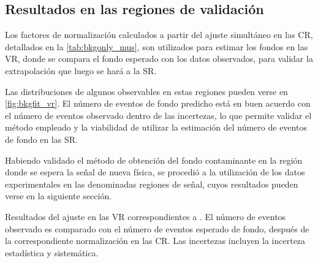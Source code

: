 \subsection{Resultados en las regiones de validación}

Los factores de normalización calculados a partir del ajuste simultáneo en las
CR, detallados en la \cref{tab:bkgonly_mus}, son utilizados para estimar los fondos
en las VR, donde se compara el fondo esperado con los datos observados, para
validar la extrapolación que luego se hará a la SR.

Las distribuciones de algunos observables en estas regiones pueden verse en
\cref{fig:bkgfit_vr}. El número de eventos de fondo predicho
está en buen acuerdo con el número de eventos observado dentro de las
incertezas, lo que permite validar el método empleado y la viabilidad de
utilizar la estimación del número de eventos de fondo en las SR.

Habiendo validado el método de obtención del fondo contaminante en la región
donde se espera la señal de nueva física, se procedió a la utilización de los
datos experimentales en las denominadas regiones de señal, cuyos resultados
pueden verse en la siguiente sección.





\begin{table}[!htbp]

  \caption{Resultados del ajuste en las VR correspondientes a {\SRL}.
    El número de eventos observado es comparado con el número de eventos esperado de fondo, después de la correspondiente
    normalización en las CR. Las incertezas incluyen la incerteza estadística y sistemática.}
  \label{tab:fit_result_vrl1}

  

\end{table}


